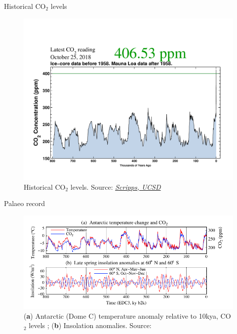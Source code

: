 \documentclass{beamer}
\begin{document}
\begin{frame}{Historical CO$_2$ levels}
\begin{figure}
\includegraphics[width=\linewidth]{./Images/co2_800k}
\caption{\label{fig:CO2} Historical CO$_2$ levels. {\tiny Source: \href{https://scripps.ucsd.edu/programs/keelingclone/wp-content/plugins/sio-bluemoon/graphs/co2_800k.pdf}{\textit{Scripps, UCSD}}}}
\end{figure}
\end{frame}

\begin{frame}{Palaeo record}
\begin{figure}
\includegraphics[width=\linewidth]{./Images/PaleoTemp_CO2_Insolation.png}
\caption{\label{fig:Palaeo} ({\bf a}) Antarctic (Dome C) temperature anomaly relative to 10kya, CO$_2$ levels \citep{luthi2008PalaeoCO2}; ({\bf b}) Insolation anomalies. {\tiny Source: \citep{hansen2016IceMelt}}}
\end{figure}
\end{frame}
\end{document}
